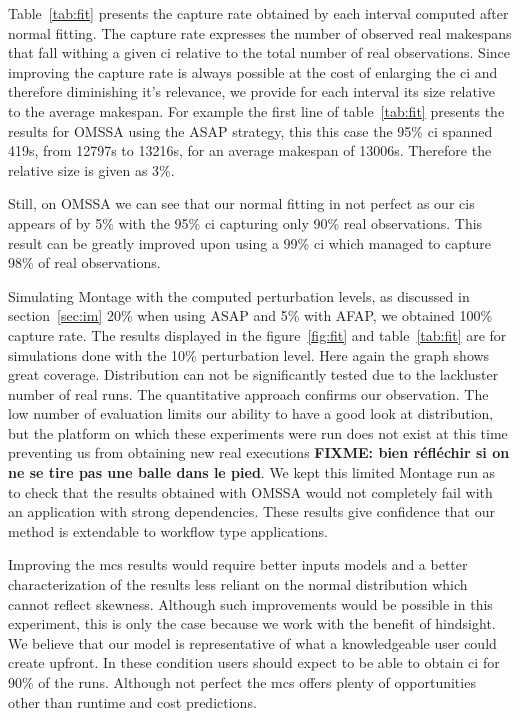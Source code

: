 \documentclass[10pt,conference,compsocconf]{IEEEtran}
\begin{document}
Table~\ref{tab:fit} presents the capture rate obtained by each interval computed
after normal fitting. The capture rate expresses the number of observed real
makespans that fall withing a given \ac{ci} relative to the total number of real
observations. Since improving the capture rate is always possible at the cost of
enlarging the \ac{ci} and therefore diminishing it's relevance, we provide for
each interval its size relative to the average makespan. For example the first
line of table~\ref{tab:fit} presents the results for OMSSA using the ASAP
strategy, this this case the 95\% \ac{ci} spanned 419s, from 12797s to 13216s,
for an average makespan of 13006s. Therefore the relative size is given as 3\%.

Still, on OMSSA we can see that our normal fitting in not perfect as our \acp{ci}
appears of by 5\% with the 95\% \ac{ci} capturing only 90\% real observations.
This result can be greatly improved upon using a 99\% \ac{ci} which managed to
capture 98\% of real observations.

Simulating Montage with the computed perturbation levels, as discussed in
section~\ref{sec:im} 20\% when using ASAP and 5\% with AFAP, we obtained 100\%
capture rate. The results displayed in the figure~\ref{fig:fit} and
table~\ref{tab:fit} are for simulations done with the 10\% perturbation level.   
Here again the graph shows great coverage. Distribution can not be significantly
tested due to the lackluster number of real runs. The quantitative approach
confirms our observation. The low number of evaluation limits our ability to
have a good look at distribution, but the platform on which these experiments
were run does not exist at this time preventing us from obtaining new real
executions \textbf{FIXME: bien réfléchir si on ne se tire pas une balle dans le
  pied}.
 We kept this limited Montage run as to check that the results
obtained with OMSSA would not completely fail with an application with strong
dependencies. These results give confidence that our method is extendable to
workflow type applications.  

Improving the \ac{mcs} results would require better inputs models and a better
characterization of the results less reliant on the normal distribution which
cannot reflect skewness. Although such improvements would be possible in this
experiment, this is only the case because we work with the benefit of hindsight.
We believe that our model is representative of what a knowledgeable user could
create upfront. In these condition users should expect to be able to obtain
\ac{ci} for 90\% of the runs. Although not perfect the \ac{mcs} offers plenty of
opportunities other than runtime and cost predictions.
\end{document}
